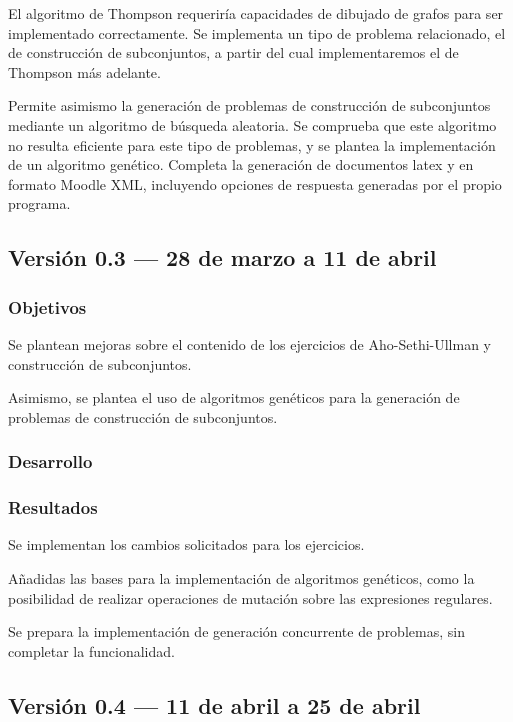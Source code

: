 El algoritmo de Thompson requeriría capacidades de dibujado de grafos para ser implementado correctamente.
Se implementa un tipo de problema relacionado, el de construcción de subconjuntos, a partir del cual implementaremos el de Thompson más adelante.

Permite asimismo la generación de problemas de construcción de subconjuntos mediante un algoritmo de búsqueda aleatoria.
Se comprueba que este algoritmo no resulta eficiente para este tipo de problemas, y se plantea la implementación de un algoritmo genético.
Completa la generación de documentos latex y en formato Moodle XML, incluyendo opciones de respuesta generadas por el propio programa.

\subsection{Versión 0.3 --- 28 de marzo a 11 de abril}

\subsubsection{Objetivos}
Se plantean mejoras sobre el contenido de los ejercicios de Aho-Sethi-Ullman y construcción de subconjuntos.

Asimismo, se plantea el uso de algoritmos genéticos para la generación de problemas de construcción de subconjuntos.

\subsubsection{Desarrollo}

\subsubsection{Resultados}
Se implementan los cambios solicitados para los ejercicios.

Añadidas las bases para la implementación de algoritmos genéticos, como la posibilidad de realizar operaciones de mutación sobre las expresiones regulares.

Se prepara la implementación de generación concurrente de problemas, sin completar la funcionalidad.

\subsection{Versión 0.4 --- 11 de abril a 25 de abril}

